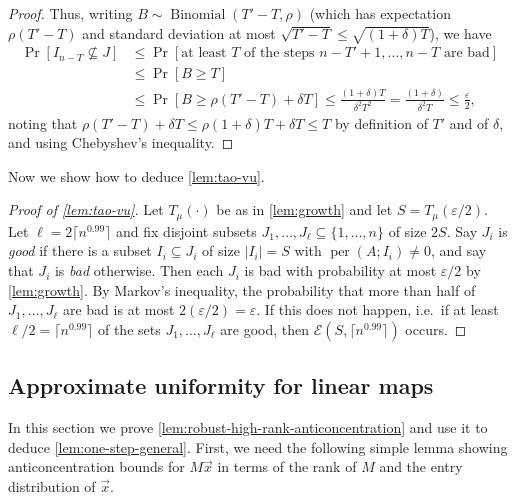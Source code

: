 \documentclass[10pt,reqno]{amsart}
\numberwithin{equation}{section}
\theoremstyle{remark}
\newcommand{\mc}{\mathcal}
\newcommand{\on}{\operatorname}
\begin{document}
\begin{proof}
Thus, writing $B\sim\on{Binomial}(T'-T,\rho)$ (which has expectation $\rho(T'-T)$ and standard deviation at
most $\sqrt{T'-T}\le \sqrt{(1+\delta)T}$), we have
\begin{align*}
\Pr[I_{n-T}\not\subseteq J] & \le\Pr[\text{at least }T\text{ of the steps }n-T'+1,\dots,n-T\text{ are bad}]\\
 & \le\Pr[B\ge T]\\
 & \le\Pr[B\ge\rho(T'-T)+\delta T]\le\frac{(1+\delta)T}{\delta^2 T^2}=\frac{(1+\delta)}{\delta^2 T}\le \frac{\varepsilon}{2},
\end{align*}
noting that $\rho(T'-T)+\delta T\le \rho(1+\delta) T+\delta T\le T$ by definition of $T'$ and of $\delta$, and using Chebyshev's inequality.
\end{proof}

Now we show how to deduce \cref{lem:tao-vu}.

\begin{proof}[Proof of \cref{lem:tao-vu}]
 Let $T_\mu(\cdot)$ be as in \cref{lem:growth} and let $S=T_\mu(\varepsilon/2)$.
Let $\ell=2\lceil n^{0.99}\rceil$
and fix disjoint subsets $J_{1},\dots,J_{\ell}\subseteq\{1,\dots,n\}$
of size $2S$. Say $J_{i}$ is \emph{good} if there is a
subset $I_i\subseteq J_i$ of size $|I_i|=S$ with $\on{per}(A;I_i)\ne0$, and say that $J_{i}$ is \emph{bad} otherwise. Then each $J_{i}$
is bad with probability at most $\varepsilon/2$ by
\cref{lem:growth}. By Markov's inequality, the probability that more than half
of $J_{1},\dots,J_{\ell}$ are bad is at most $2(\varepsilon/2)=\varepsilon$. If this does not happen, i.e.\ if at least $\ell/2=\lceil n^{0.99}\rceil$ of the sets $J_{1},\dots,J_{\ell}$ are good, then $\mc E(S,\lceil n^{0.99}\rceil)$ occurs.
\end{proof}

\subsection{Approximate uniformity for linear maps}\label{sec:approx-uniformity}
In this section we prove \cref{lem:robust-high-rank-anticoncentration} and use it to deduce \cref{lem:one-step-general}. First, we need the following simple lemma showing anticoncentration bounds for $M\vec x$ in terms of the rank of $M$ and the entry distribution of $\vec x$.
\end{document}
